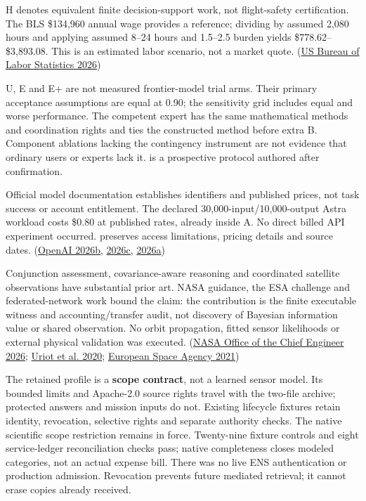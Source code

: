 \documentclass[11pt,letterpaper]{article}
\begin{document}
H denotes equivalent finite decision-support work, not flight-safety
certification. The BLS \$134,960 annual wage provides a reference;
dividing by assumed 2,080 hours and applying assumed 8--24 hours and
1.5--2.5 burden yields \$778.62--\$3,893.08. This is an estimated labor
scenario, not a market quote. (\protect\hyperlink{ref-bls2026}{US Bureau
of Labor Statistics 2026})

U, E and E+ are not measured frontier-model trial arms. Their primary
acceptance assumptions are equal at 0.90; the sensitivity grid includes
equal and worse performance. The competent expert has the same
mathematical methods and coordination rights and ties the constructed
method before extra B. Component ablations lacking the contingency
instrument are not evidence that ordinary users or experts lack it.
 is a prospective protocol authored after
confirmation.

Official model documentation establishes identifiers and published
prices, not task success or account entitlement. The declared
30,000-input/10,000-output Astra workload costs \$0.80 at published
rates, already inside A. No direct billed API experiment occurred.
 preserves access limitations, pricing
details and source dates. (\protect\hyperlink{ref-astra}{OpenAI 2026b},
\protect\hyperlink{ref-terra}{2026c},
\protect\hyperlink{ref-pricing}{2026a})

Conjunction assessment, covariance-aware reasoning and coordinated
satellite observations have substantial prior art. NASA guidance, the
ESA challenge and federated-network work bound the claim: the
contribution is the finite executable witness and accounting/transfer
audit, not discovery of Bayesian information value or shared
observation. No orbit propagation, fitted sensor likelihoods or external
physical validation was executed. (\protect\hyperlink{ref-nasa2026}{NASA
Office of the Chief Engineer 2026};
\protect\hyperlink{ref-uriot2020}{Uriot et al. 2020};
\protect\hyperlink{ref-esa2021}{European Space Agency 2021})

The retained profile is a \textbf{scope contract}, not a learned sensor
model. Its bounded limits and Apache-2.0 source rights travel with the
two-file archive; protected answers and mission inputs do not. Existing
lifecycle fixtures retain identity, revocation, selective rights and
separate authority checks. The native scientific scope restriction
remains in force. Twenty-nine fixture controls and eight service-ledger
reconciliation checks pass; native completeness closes modeled
categories, not an actual expense bill. There was no live ENS
authentication or production admission. Revocation prevents future
mediated retrieval; it cannot erase copies already received.
\end{document}
